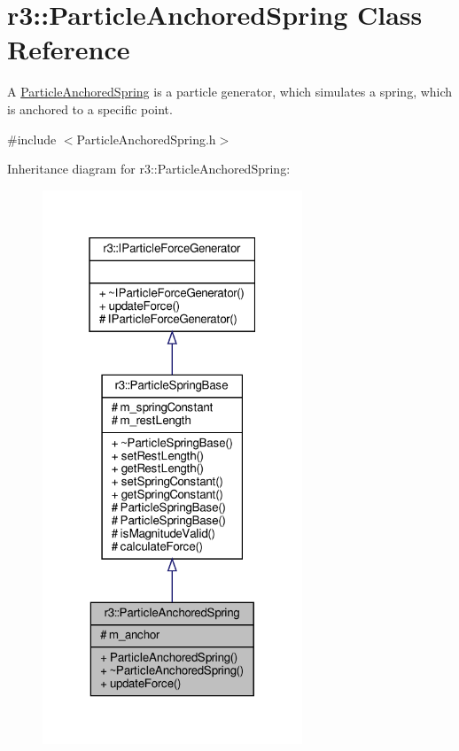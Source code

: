 \hypertarget{classr3_1_1_particle_anchored_spring}{}\section{r3\+:\+:Particle\+Anchored\+Spring Class Reference}
\label{classr3_1_1_particle_anchored_spring}


A \mbox{\hyperlink{classr3_1_1_particle_anchored_spring}{Particle\+Anchored\+Spring}} is a particle generator, which simulates a spring, which is anchored to a specific point.  




{\ttfamily \#include $<$Particle\+Anchored\+Spring.\+h$>$}



Inheritance diagram for r3\+:\+:Particle\+Anchored\+Spring\+:\nopagebreak
\begin{figure}[H]
\begin{center}
\leavevmode
\includegraphics[width=220pt]{classr3_1_1_particle_anchored_spring__inherit__graph}
\end{center}
\end{figure}


